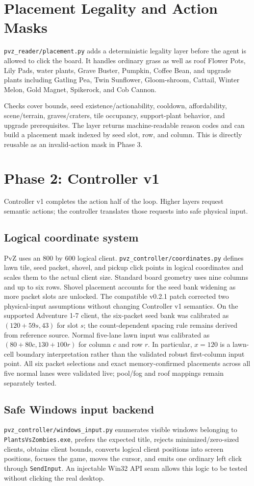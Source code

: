 \documentclass[11pt,a4paper]{article}
\begin{document}
\section{Placement Legality and Action Masks}
\texttt{pvz\_reader/placement.py} adds a deterministic legality layer before the agent is allowed to click the board. It handles ordinary grass as well as roof Flower Pots, Lily Pads, water plants, Grave Buster, Pumpkin, Coffee Bean, and upgrade plants including Gatling Pea, Twin Sunflower, Gloom-shroom, Cattail, Winter Melon, Gold Magnet, Spikerock, and Cob Cannon.

Checks cover bounds, seed existence/actionability, cooldown, affordability, scene/terrain, graves/craters, tile occupancy, support-plant behavior, and upgrade prerequisites. The layer returns machine-readable reason codes and can build a placement mask indexed by seed slot, row, and column. This is directly reusable as an invalid-action mask in Phase 3.
\section{Phase 2: Controller v1}
Controller v1 completes the action half of the loop. Higher layers request semantic actions; the controller translates those requests into safe physical input.
\subsection{Logical coordinate system}
PvZ uses an 800 by 600 logical client. \texttt{pvz\_controller/coordinates.py} defines lawn tile, seed packet, shovel, and pickup click points in logical coordinates and scales them to the actual client size. Standard board geometry uses nine columns and up to six rows. Shovel placement accounts for the seed bank widening as more packet slots are unlocked.
The compatible v0.2.1 patch corrected two physical-input assumptions without
changing Controller v1 semantics. On the supported Adventure 1-7 client, the
six-packet seed bank was calibrated as $(120 + 59s, 43)$ for slot $s$; the
count-dependent spacing rule remains derived from reference source. Normal
five-lane lawn input was calibrated as $(80 + 80c, 130 + 100r)$ for column
$c$ and row $r$. In particular, $x=120$ is a lawn-cell boundary interpretation
rather than the validated robust first-column input point. All six packet
selections and exact memory-confirmed placements across all five normal lanes
were validated live; pool/fog and roof mappings remain separately tested.
\subsection{Safe Windows input backend}
\texttt{pvz\_controller/windows\_input.py} enumerates visible windows belonging to \texttt{PlantsVsZombies.exe}, prefers the expected title, rejects minimized/zero-sized clients, obtains client bounds, converts logical client positions into screen positions, focuses the game, moves the cursor, and emits one ordinary left click through \texttt{SendInput}. An injectable Win32 API seam allows this logic to be tested without clicking the real desktop.
\end{document}
